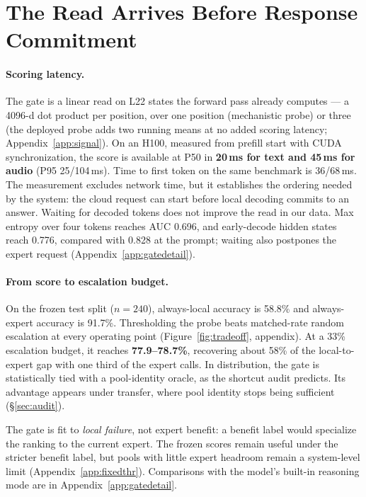 \section{The Read Arrives Before Response Commitment}
\label{sec:system}

\paragraph{Scoring latency.}
The gate is a linear read on L22 states the forward pass already
computes --- a 4096-d dot product per position, over one position
(mechanistic probe) or three (the deployed probe adds two running
means at no added scoring latency; Appendix~\ref{app:signal}).
On an H100, measured from prefill start with CUDA synchronization, the
score is available at P50 in \textbf{20\,ms for text and 45\,ms for
audio} (P95 25/104\,ms). Time to first token on the same benchmark is
36/68\,ms. The measurement excludes network time, but it establishes
the ordering needed by the system: the cloud request can start before
local decoding commits to an answer. Waiting for decoded tokens does
not improve the read in our data. Max entropy over four tokens reaches
AUC 0.696, and early-decode hidden states reach 0.776, compared with
0.828 at the prompt; waiting also postpones the expert request
(Appendix~\ref{app:gatedetail}).

\paragraph{From score to escalation budget.}
On the frozen test split ($n{=}240$), always-local accuracy is 58.8\%
and always-expert accuracy is 91.7\%. Thresholding the probe beats
matched-rate random escalation at every operating point
(Figure~\ref{fig:tradeoff}, appendix). At a 33\% escalation budget, it
reaches \textbf{77.9--78.7\%}, recovering about 58\% of the
local-to-expert gap with one third of the expert calls. In
distribution, the gate is statistically tied with a pool-identity
oracle, as the shortcut audit predicts. Its advantage appears under
transfer, where pool identity stops being sufficient
(\S\ref{sec:audit}).

The gate is fit to \emph{local failure}, not expert benefit: a benefit
label would specialize the ranking to the current expert. The frozen
scores remain useful under the stricter benefit label, but pools with
little expert headroom remain a system-level limit
(Appendix~\ref{app:fixedthr}). Comparisons with the model's built-in
reasoning mode are in Appendix~\ref{app:gatedetail}.
